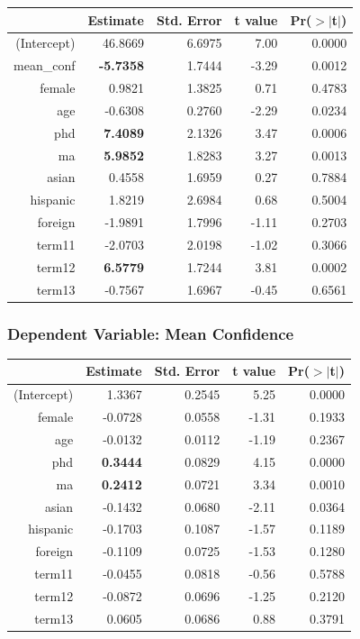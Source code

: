 \documentclass[11pt]{article} %
\begin{document}
\begin{table}[H]
\centering
\begin{tabular}{rrrrr}
  \hline
 & Estimate & Std. Error & t value & Pr($>$$|$t$|$) \\ 
  \hline
(Intercept) & 46.8669 & 6.6975 & 7.00 & 0.0000 \\ 
  mean\_conf & \textbf{-5.7358} & 1.7444 & -3.29 & 0.0012 \\ 
  female & 0.9821 & 1.3825 & 0.71 & 0.4783 \\ 
  age & -0.6308 & 0.2760 & -2.29 & 0.0234 \\ 
  phd & \textbf{7.4089} & 2.1326 & 3.47 & 0.0006 \\ 
  ma & \textbf{5.9852} & 1.8283 & 3.27 & 0.0013 \\ 
  asian & 0.4558 & 1.6959 & 0.27 & 0.7884 \\ 
  hispanic & 1.8219 & 2.6984 & 0.68 & 0.5004 \\ 
  foreign & -1.9891 & 1.7996 & -1.11 & 0.2703 \\ 
  term11 & -2.0703 & 2.0198 & -1.02 & 0.3066 \\ 
  term12 &\textbf{ 6.5779} & 1.7244 & 3.81 & 0.0002 \\ 
  term13 & -0.7567 & 1.6967 & -0.45 & 0.6561 \\ 
   \hline
\end{tabular}
\end{table}

\subsubsection{Dependent Variable: Mean Confidence}

\begin{table}[H]
\centering
% 
\begin{tabular}{rrrrr}
  \hline
 & Estimate & Std. Error & t value & Pr($>$$|$t$|$) \\ 
  \hline
(Intercept) & 1.3367 & 0.2545 & 5.25 & 0.0000 \\ 
  female &-0.0728 & 0.0558 & -1.31 & 0.1933 \\ 
  age & -0.0132 & 0.0112 & -1.19 & 0.2367 \\ 
  phd & \textbf{0.3444} & 0.0829 & 4.15 & 0.0000 \\ 
  ma & \textbf{0.2412} & 0.0721 & 3.34 & 0.0010 \\ 
  asian &-0.1432 & 0.0680 & -2.11 & 0.0364 \\ 
  hispanic & -0.1703 & 0.1087 & -1.57 & 0.1189 \\ 
  foreign &-0.1109 & 0.0725 & -1.53 & 0.1280 \\ 
  term11 & -0.0455 & 0.0818 & -0.56 & 0.5788 \\ 
  term12 & -0.0872& 0.0696 & -1.25 & 0.2120 \\ 
  term13 & 0.0605 & 0.0686 & 0.88 & 0.3791 \\ 
   \hline
\end{tabular}
\end{table}
\end{document}
